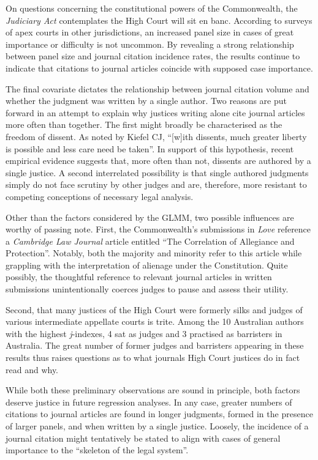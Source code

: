 On questions concerning the constitutional powers of the Commonwealth, the \textit{Judiciary Act} contemplates the High Court will sit en banc. According to surveys of apex courts in other jurisdictions, an increased panel size in cases of great importance or difficulty is not uncommon. By revealing a strong relationship between panel size and journal citation incidence rates, the results continue to indicate that citations to journal articles coincide with supposed case importance.

The final covariate dictates the relationship between journal citation volume and whether the judgment was written by a single author. Two reasons are put forward in an attempt to explain why justices writing alone cite journal articles more often than together. The first might broadly be characterised as the freedom of dissent. As noted by Kiefel CJ, ``[w]ith dissents, much greater liberty is possible and less care need be taken''. In support of this hypothesis, recent empirical evidence suggests that, more often than not, dissents are authored by a single justice. A second interrelated possibility is that single authored judgments simply do not face scrutiny by other judges and are, therefore, more resistant to competing conceptions of necessary legal analysis.

Other than the factors considered by the GLMM, two possible influences are worthy of passing note. First, the Commonwealth's submissions in \textit{Love} reference a \textit{Cambridge Law Journal} article entitled ``The Correlation of Allegiance and Protection''. Notably, both the majority and minority refer to this article while grappling with the interpretation of alienage under the Constitution. Quite possibly, the thoughtful reference to relevant journal articles in written submissions unintentionally coerces judges to pause and assess their utility. 

Second, that many justices of the High Court were formerly silks and judges of various intermediate appellate courts is trite. Among the 10 Australian authors with the highest \textit{j}-indexes, 4 sat as judges and 3 practised as barristers in Australia. The great number of former judges and barristers appearing in these results thus raises questions as to what journals High Court justices do in fact read and why.

While both these preliminary observations are sound in principle, both factors deserve justice in future regression analyses. In any case, greater numbers of citations to journal articles are found in longer judgments, formed in the presence of larger panels, and when written by a single justice. Loosely, the incidence of a journal citation might tentatively be stated to align with cases of general importance to the ``skeleton of the legal system''.

